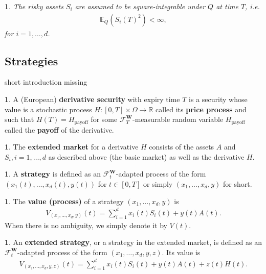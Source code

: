 \documentclass[english]{article}
\newcommand{\comment}[1]{\color{blue}#1\color{black}}
\numberwithin{equation}{section}
\numberwithin{figure}{section}
\theoremstyle{bolddescit}
\theoremstyle{definition}
\newtheorem{definition}[theorem]{\protect\definitionname}
\theoremstyle{definition}
\theoremstyle{plain}
\theoremstyle{plain}
\theoremstyle{bolddesc}
\newtheorem{assumption}[theorem]{\protect\assumptionname}
\theoremstyle{plain}
\theoremstyle{remark}
\providecommand{\assumptionname}{Assumption}
\providecommand{\definitionname}{Definition}
\begin{document}
\begin{assumption}\label{ass:bs-stock-price-square-integrability}
  The risky assets $S_i$ are assumed to be square-integrable under $Q$ at time $T$, i.e.
  \begin{align*}
    \mathbb{E}_Q(S_i(T)^2) < \infty,
  \end{align*}
  for $i=1,\ldots,d$.
\end{assumption}

\subsection{Strategies}

\comment{short introduction missing}

\begin{definition}
  A (European) \textbf{derivative security} with expiry time $T$ is a security whose value is a stochastic process $H : [0,T] \times \Omega \to \mathbb{R}$ called its \textbf{price process} and such that $H(T) = H_\text{payoff}$ for some $\mathcal{F}^\mathbf{W}_T$-measurable random variable $H_\text{payoff}$ called the \textbf{payoff} of the derivative.
\end{definition}

\begin{definition}
  The \textbf{extended market} for a derivative $H$ consists of the assets $A$ and $S_i, i=1,\ldots,d$ as described above (the basic market) as well as the derivative $H$.
\end{definition}

\begin{definition}
  A \textbf{strategy} is defined as an $\mathcal{F}^\mathbf{W}_t$-adapted process of the form\\ $(x_1(t),\ldots,x_d(t),y(t))$ for $t \in [0,T]$ or simply $(x_1,\ldots,x_d,y)$ for short.
\end{definition}

\begin{definition}
  The \textbf{value (process)} of a strategy $(x_1,\ldots,x_d,y)$ is
  \begin{align*}
    V_{(x_1,\ldots,x_d,y)}(t) = \sum_{i=1}^d x_i(t) S_i(t) + y(t) A(t).
  \end{align*}
  When there is no ambiguity, we simply denote it by $V(t)$.
\end{definition}

\begin{definition}
  An \textbf{extended strategy}, or a strategy in the extended market, is defined as an $\mathcal{F}^\mathbf{W}_t$-adapted process of the form $(x_1,\ldots,x_d,y,z)$. Its value is
  \begin{align*}
    V_{(x_1,\ldots,x_d,y,z)}(t)
    = \sum_{i=1}^d x_i(t) S_i(t) + y(t) A(t) + z(t) H(t).
  \end{align*}
\end{definition}
\end{document}
